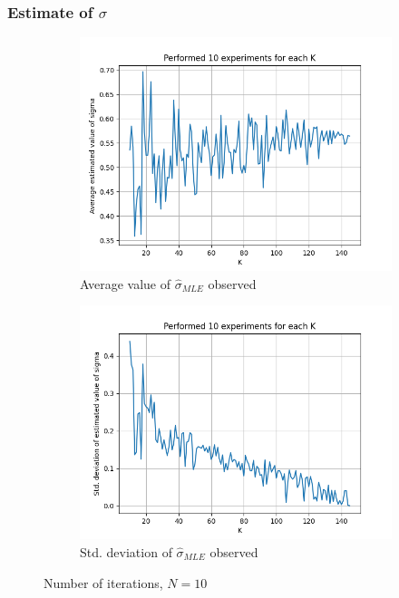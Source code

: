 \documentclass[fleqn, 11pt]{article}
\begin{document}
\subsubsection{Estimate of $\sigma$}
\begin{figure}[H]
    \centering
    \begin{subfigure}[H]{0.49\textwidth}
        \centering
        \includegraphics[width=\textwidth]{P1_sigma/avgs_10.png}
        \caption[]{Average value of $\hat{\sigma}_{MLE}$ observed}
    \end{subfigure}
    \begin{subfigure}[H]{0.49\textwidth}
        \centering
        \includegraphics[width=\textwidth]{P1_sigma/stds_10.png}
        \caption[]{Std. deviation of $\hat{\sigma}_{MLE}$ observed}
    \end{subfigure}
    \caption{Number of iterations, $N = 10$}
\end{figure}
\end{document}
